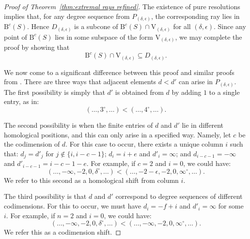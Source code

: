 \documentclass[12pt]{amsart}
\theoremstyle{definition}
\theoremstyle{remark}
\newcommand{\VV}{\mathrm{V}}
\newcommand{\bb}{c}
\newcommand{\dd}{d}
\newcommand{\defi}[1]{\textsf{#1}} %
\newcommand{\BBQ}{\mathrm{B}}
\begin{document}
\begin{proof}[Proof of Theorem~\ref{thm:extremal rays refined}]
The existence of pure resolutions~\cite[Theorem~0.1]{eis-schrey1} implies that, for any degree sequence from $P_{(\delta,\epsilon)}$, the corresponding ray lies in $\BBQ^{\bb}(S)$.  Hence $D_{(\delta,\epsilon)}$ is a subcone of $\BBQ^{\bb}(S)\cap \VV_{(\delta,\epsilon)}$ for all $(\delta,\epsilon)$.  
Since any point of $\BBQ^{\bb}(S)$ lies in some subspace of the form $\VV_{(\delta,\epsilon)}$, we may complete the proof by showing that
\begin{equation}\label{eqn:inclusion}
\BBQ^{\bb}(S)\cap \VV_{(\delta,\epsilon)} \subseteq D_{(\delta,\epsilon)}.
\end{equation}

We now come to a significant difference between this proof and similar proofs from \cites{eis-schrey1,boij-sod2}.  There are three ways that  adjacent elements $d<d'$ can arise in $P_{(\delta,\epsilon)}$.   The first possibility is simply that $d'$ is obtained from $\dd$ by adding $1$ to a single entry, as in:
\[
(\dots,3^\circ,\dots)<(\dots,4^\circ,\dots).
\]

The second possibility is when the finite entries of $\dd$ and $d'$ lie in different homological positions, and this can only arise in a specified way.  Namely, let $c$ be the codimension of $\dd$.  For this case to occur, there exists a unique column $i$ such that: $d_j=d'_j$ for $j\notin \{i, i-c-1\}$; $d_i=i+e$ and $d'_i=\infty$; and $d_{i-c-1}=-\infty$ and $d'_{i-c-1}=i-c-1-e$.  For example, if $c=2$ and $i=0$, we could have:
\[
(\dots, -\infty, -2, 0, \delta^\circ, \dots)<(\dots, -2-\epsilon,-2, 0, \infty^\circ, \dots).
\]
We refer to this second as a \defi{homological shift from column $i$}.

The third possibility is that $\dd$ and $d'$ correspond to degree sequences of different codimensions.  For this to occur, we must have $d_{i}=-f+i$ and $d'_i=\infty$ for some $i$.  
For example, if $n=2$ and $i=0$, we could have:
\[
(\dots, -\infty, -2, 0, \delta^\circ, \dots)<(\dots, -\infty,-2, 0, \infty^\circ, \dots).
\]
We refer this as a \defi{codimension shift}.  



\end{proof}
\end{document}
